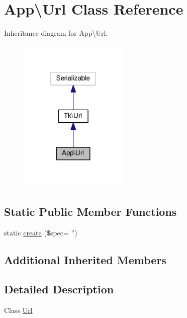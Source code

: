 \hypertarget{classApp_1_1Url}{\section{App\textbackslash{}Url Class Reference}
\label{classApp_1_1Url}
}


Inheritance diagram for App\textbackslash{}Url\+:\nopagebreak
\begin{figure}[H]
\begin{center}
\leavevmode
\includegraphics[width=147pt]{classApp_1_1Url__inherit__graph}
\end{center}
\end{figure}
\subsection*{Static Public Member Functions}
\begin{DoxyCompactItemize}
\item 
static \hyperlink{classApp_1_1Url_a6f0f11b3d26275fa75c52596e3567931}{create} (\$spec= '')
\end{DoxyCompactItemize}
\subsection*{Additional Inherited Members}


\subsection{Detailed Description}
Class \hyperlink{classApp_1_1Url}{Url}


